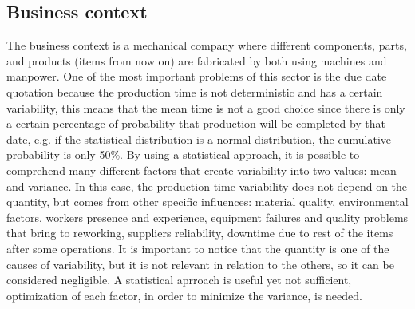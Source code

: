 \documentclass[a4paper,12pt]{article}
\begin{document}
\subsection{Business context}
The business context is a mechanical company where different components, parts, and products (items from now on) are fabricated by both using machines and manpower. One of the most important problems of this sector is the due date quotation because the production time is not deterministic and has a certain variability, this means that the mean time is not a good choice since there is only a certain percentage of probability that production will be completed by that date, e.g. if the statistical distribution is a normal distribution,  the cumulative probability is only 50\%. By using a statistical approach, it is possible to comprehend many different factors that create variability into two values: mean and variance. In this case, the production time variability does not depend on the quantity, but comes from other specific influences: material quality, environmental factors, workers presence and experience, equipment failures and quality problems that bring to reworking, suppliers reliability, downtime due to rest of the items after some operations. It is important to notice that the quantity is one of the causes of variability, but it is not relevant in relation to the others, so it can be considered negligible. A statistical aprroach is useful yet not sufficient, optimization of each factor, in order to minimize the variance, is needed.\\
\end{document}
